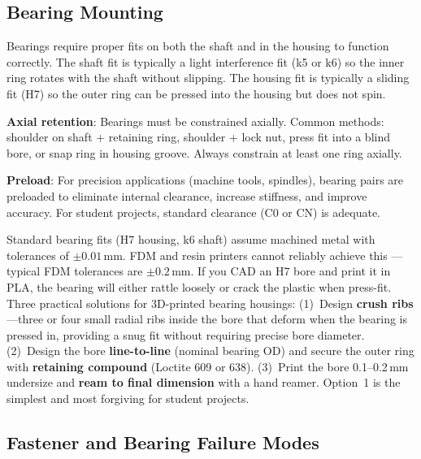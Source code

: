 \documentclass[11pt,letterpaper,twoside,openany]{book}
\begin{document}
\subsection{Bearing Mounting}
Bearings require proper fits on both the shaft and in the housing to function correctly. The shaft fit is typically a light interference fit (k5 or k6) so the inner ring rotates with the shaft without slipping. The housing fit is typically a sliding fit (H7) so the outer ring can be pressed into the housing but does not spin.

\textbf{Axial retention}: Bearings must be constrained axially. Common methods: shoulder on shaft + retaining ring, shoulder + lock nut, press fit into a blind bore, or snap ring in housing groove. Always constrain at least one ring axially.

\textbf{Preload}: For precision applications (machine tools, spindles), bearing pairs are preloaded to eliminate internal clearance, increase stiffness, and improve accuracy. For student projects, standard clearance (C0 or CN) is adequate.

\begin{tipbox}
Standard bearing fits (H7 housing, k6 shaft) assume machined metal with tolerances of $\pm 0.01$\,mm. FDM and resin printers cannot reliably achieve this --- typical FDM tolerances are $\pm 0.2$\,mm. If you CAD an H7 bore and print it in PLA, the bearing will either rattle loosely or crack the plastic when press-fit. Three practical solutions for 3D-printed bearing housings: (1)~Design \textbf{crush ribs}---three or four small radial ribs inside the bore that deform when the bearing is pressed in, providing a snug fit without requiring precise bore diameter. (2)~Design the bore \textbf{line-to-line} (nominal bearing OD) and secure the outer ring with \textbf{retaining compound} (Loctite 609 or 638). (3)~Print the bore 0.1--0.2\,mm undersize and \textbf{ream to final dimension} with a hand reamer. Option~1 is the simplest and most forgiving for student projects.
\end{tipbox}

\subsection{Fastener and Bearing Failure Modes}
\end{document}

